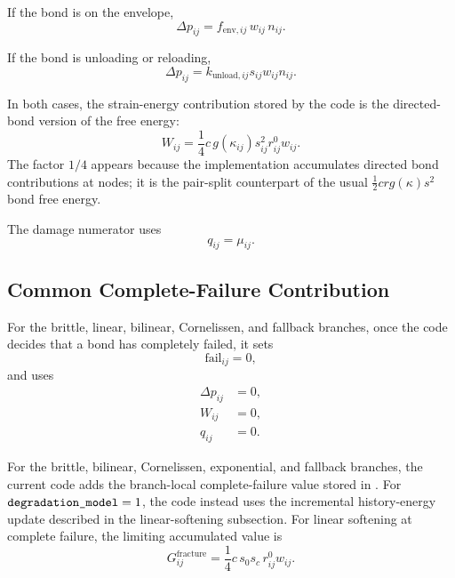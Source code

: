 \documentclass[11pt]{article}
\newcommand{\code}[1]{\texttt{\detokenize{#1}}}
\begin{document}
If the bond is on the envelope,
\begin{equation}
    \Delta p_{ij}
    =
    f_{\mathrm{env},ij}\,w_{ij}\,n_{ij}.
\end{equation}

If the bond is unloading or reloading,
\begin{equation}
    \Delta p_{ij}
    =
    k_{\mathrm{unload},ij}
    s_{ij}
    w_{ij}
    n_{ij}.
\end{equation}

In both cases, the strain-energy contribution stored by the code is the
directed-bond version of the free energy:
\begin{equation}
    W_{ij}
    =
    \frac{1}{4}
    c\,g(\kappa_{ij})
    s_{ij}^{2}
    r_{ij}^0
    w_{ij}.
\end{equation}
The factor \(1/4\) appears because the implementation accumulates directed
bond contributions at nodes; it is the pair-split counterpart of the usual
\(\frac12 c r g(\kappa)s^2\) bond free energy.

The damage numerator uses
\begin{equation}
    q_{ij}=\mu_{ij}.
\end{equation}

\subsection{Common Complete-Failure Contribution}

For the brittle, linear, bilinear, Cornelissen, and fallback branches, once the
code decides that a bond has completely failed, it sets
\begin{equation}
    \mathrm{fail}_{ij}=0,
\end{equation}
and uses
\begin{align}
    \Delta p_{ij} &= 0, \\
    W_{ij} &= 0, \\
    q_{ij} &= 0.
\end{align}

For the brittle, bilinear, Cornelissen, exponential, and fallback branches, the
current code adds the branch-local complete-failure value stored in
\code{d_fracture_energy}. For \(\code{degradation_model}=1\), the code instead
uses the incremental history-energy update described in the linear-softening
subsection. For linear softening at complete failure, the limiting accumulated
value is
\begin{equation}
    G_{ij}^{\mathrm{fracture}}
    =
    \frac14 c\,s_0s_c\,r_{ij}^0w_{ij}.
\end{equation}
\end{document}
